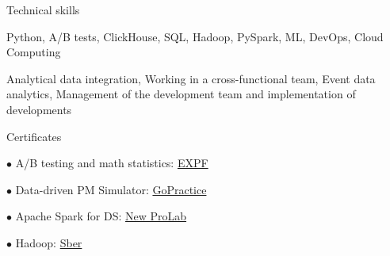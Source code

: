 \documentclass{resume} %
\begin{document}
    
\begin{rSection}{ Technical skills }
    
    Python, A/B tests, ClickHouse, SQL, Hadoop, PySpark, ML, DevOps, Cloud Computing
    
    Analytical data integration, Working in a cross-functional team, Event data analytics, Management of the development team and implementation of developments 

\end{rSection}

\begin{rSection}{ Certificates }
    
    \begin{multicols}{2}[]

    $\bullet$ A/B testing and math statistics:
    \href{https://cloud.mail.ru/public/WhV5/7Ua4yoKkW}{EXPF}
    
    $\bullet$ Data-driven PM Simulator: \href{https://gopractice.ru/course/pm/certificate/juqpip7o}{GoPractice}
    
    $\bullet$ Apache Spark for DS: \href{https://cloud.mail.ru/public/SQAS/RrvheyFmY}{New ProLab} 
    
    $\bullet$ Hadoop: \href{https://cloud.mail.ru/public/CH8T/6mMgjbRMZ}{Sber}
    
    \end{multicols}

\end{rSection}
\end{document}

